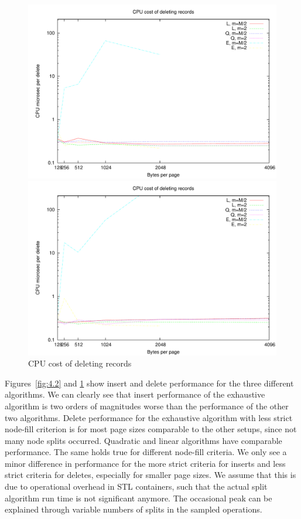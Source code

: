 \begin{figure}
\centering
\begin{minipage}{0.49\textwidth}
\centering
\includegraphics[width=\textwidth]{fig/random/figure-4-3.pdf}
\end{minipage}
\begin{minipage}{0.49\textwidth}
\centering
\includegraphics[width=\textwidth]{fig/usppp/figure-4-3.pdf}
\end{minipage}
\caption{CPU cost of deleting records}
\label{fig:4.3}
\end{figure}

Figures~\ref{fig:4.2} and \ref{fig:4.3} show insert and delete performance for the three different algorithms. We can clearly see that insert performance of the exhaustive algorithm is two orders of magnitudes worse than the performance of the other two algorithms. Delete performance for the exhaustive algorithm with less strict node-fill criterion is for most page sizes comparable to the other setups, since not many node splits occurred. Quadratic and linear algorithms  have comparable performance. The same holds true for different node-fill criteria. We only see a minor difference in performance for the more strict criteria for inserts and less strict criteria for deletes, especially for smaller page sizes. We assume that this is due to operational overhead in STL containers, such that the actual split algorithm run time is not significant anymore. The occasional peak can be explained through variable numbers of splits in the sampled operations. 

